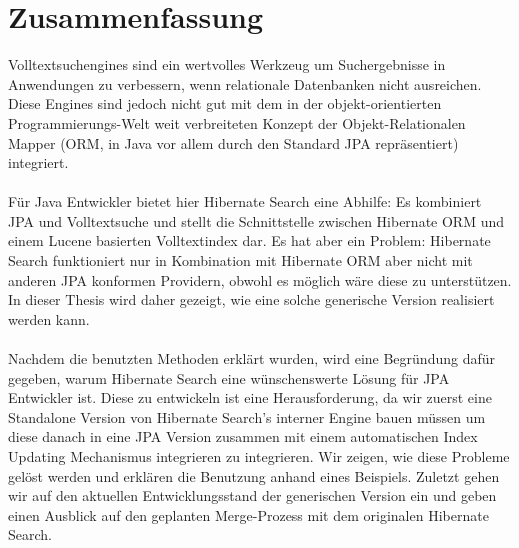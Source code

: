 \section*{Zusammenfassung}
Volltextsuchengines sind ein wertvolles Werkzeug um Suchergebnisse in Anwendungen zu verbessern, wenn relationale Datenbanken nicht ausreichen. Diese Engines sind jedoch nicht gut mit dem in der objekt-orientierten Programmierungs-Welt weit verbreiteten Konzept der Objekt-Relationalen Mapper (ORM, in Java vor allem durch den Standard JPA repräsentiert) integriert. 
\\\\
Für Java Entwickler bietet hier Hibernate Search eine Abhilfe: Es kombiniert JPA und Volltextsuche und stellt die Schnittstelle zwischen Hibernate ORM und einem Lucene basierten Volltextindex dar. Es hat aber ein Problem: Hibernate Search funktioniert nur in Kombination mit Hibernate ORM aber nicht mit anderen JPA konformen Providern, obwohl es möglich wäre diese zu unterstützen. In dieser Thesis wird daher gezeigt, wie eine solche generische Version realisiert werden kann.
\\\\
Nachdem die benutzten Methoden erklärt wurden, wird eine Begründung dafür gegeben, warum Hibernate Search eine wünschenswerte Lösung für JPA Entwickler ist. Diese zu entwickeln ist eine Herausforderung, da wir zuerst eine Standalone Version von Hibernate Search's interner Engine bauen müssen um diese danach in eine JPA Version zusammen mit einem automatischen Index Updating Mechanismus integrieren zu integrieren. Wir zeigen, wie diese Probleme gelöst werden und erklären die Benutzung anhand eines Beispiels. Zuletzt gehen wir auf den aktuellen Entwicklungsstand der generischen Version ein und geben einen Ausblick auf den geplanten Merge-Prozess mit dem originalen Hibernate Search.

